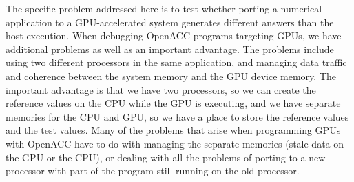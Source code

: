 The specific problem addressed here is to test whether porting a numerical application to a GPU-accelerated system generates different answers than the host execution.
When debugging OpenACC programs targeting GPUs, we have additional problems as well as an important advantage.
The problems include using two different processors in the same application, and managing data traffic and coherence between the system memory and the GPU device memory.
The important advantage is that we have two processors, so we can create the reference values on the CPU while the GPU is executing, and we have separate memories for the CPU and GPU, so we have a place to store the reference values and the test values.
Many of the problems that arise when programming GPUs with OpenACC have to do with managing the separate memories (stale data on the GPU or the CPU), or dealing with all the problems of porting to a new processor with part of the program still running on the old processor.

